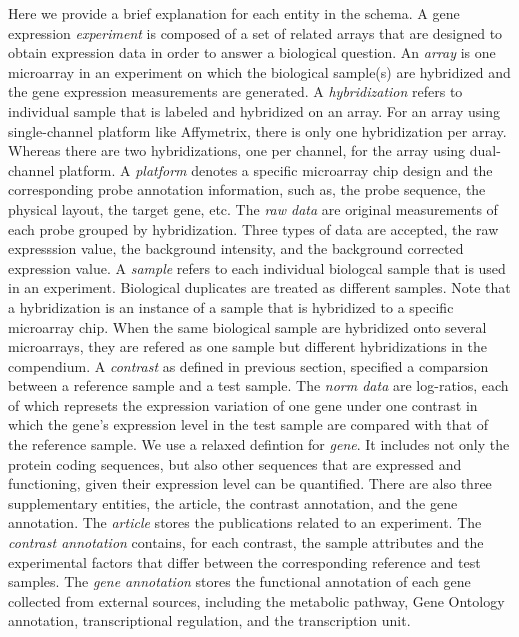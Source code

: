 Here we provide a brief explanation for each entity in the schema.
%
A gene expression \textit{experiment} is composed of a set of related arrays
that are designed to obtain expression data in order to answer a biological
question.
%
An \textit{array} is one microarray in an experiment on which the biological
sample(s) are hybridized and the gene expression measurements are generated.
%
A \textit{hybridization} refers to individual sample that is labeled and
hybridized on an array.
%
For an array using single-channel platform like Affymetrix, there is only one
hybridization per array.  Whereas there are two hybridizations, one per
channel, for the array using dual-channel platform.
%
A \textit{platform} denotes a specific microarray chip design and the
corresponding probe annotation information, such as, the probe sequence, the
physical layout, the target gene, etc.
%
The \textit{raw data} are original measurements of each probe grouped by
hybridization.  Three types of data are accepted, the raw expresssion value,
the background intensity, and the background corrected expression value.
%
A \textit{sample} refers to each individual biologcal sample that is used in
an experiment.  Biological duplicates are treated as different samples.
%
Note that a hybridization is an instance of a sample that is hybridized to a
specific microarray chip.  When the same biological sample are hybridized
onto several microarrays, they are refered as one sample but different
hybridizations in the compendium.
%
A \textit{contrast} as defined in previous section, specified a comparsion
between a reference sample and a test sample.
%
The \textit{norm data} are log-ratios, each of which represets the expression
variation of one gene under one contrast in which the gene's expression level
in the test sample are compared with that of the reference sample.
%
We use a relaxed defintion for \textit{gene}. It includes not only the protein
coding sequences, but also other sequences that are expressed and functioning,
given their expression level can be quantified.
%
There are also three supplementary entities, the article, the contrast
annotation, and the gene annotation.
%
The \textit{article} stores the publications related to an experiment.
%
The \textit{contrast annotation} contains, for each contrast, the sample
attributes and the experimental factors that differ between the corresponding
reference and test samples.
%
The \textit{gene annotation} stores the functional annotation of each gene
collected from external sources, including the metabolic pathway, Gene Ontology
annotation, transcriptional regulation, and the transcription unit.


